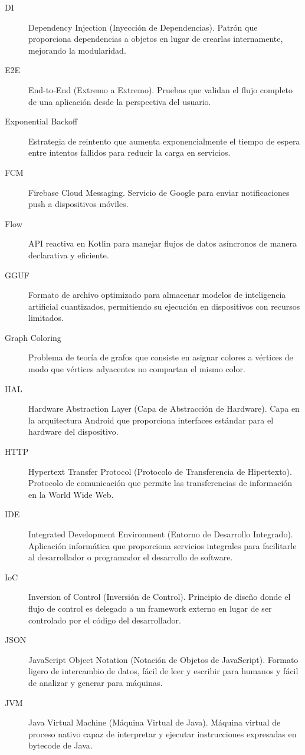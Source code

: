 \begin{description}
    \item[DI] Dependency Injection (Inyección de Dependencias). Patrón que proporciona dependencias a objetos en lugar de crearlas internamente, mejorando la modularidad.
    \item[E2E] End-to-End (Extremo a Extremo). Pruebas que validan el flujo completo de una aplicación desde la perspectiva del usuario.
    \item[Exponential Backoff] Estrategia de reintento que aumenta exponencialmente el tiempo de espera entre intentos fallidos para reducir la carga en servicios.
    \item[FCM] Firebase Cloud Messaging. Servicio de Google para enviar notificaciones push a dispositivos móviles.
    \item[Flow] API reactiva en Kotlin para manejar flujos de datos asíncronos de manera declarativa y eficiente.
    \item[GGUF] Formato de archivo optimizado para almacenar modelos de inteligencia artificial cuantizados, permitiendo su ejecución en dispositivos con recursos limitados.
    \item[Graph Coloring] Problema de teoría de grafos que consiste en asignar colores a vértices de modo que vértices adyacentes no compartan el mismo color.
    \item[HAL] Hardware Abstraction Layer (Capa de Abstracción de Hardware). Capa en la arquitectura Android que proporciona interfaces estándar para el hardware del dispositivo.
    \item[HTTP] Hypertext Transfer Protocol (Protocolo de Transferencia de Hipertexto). Protocolo de comunicación que permite las transferencias de información en la World Wide Web.
    \item[IDE] Integrated Development Environment (Entorno de Desarrollo Integrado). Aplicación informática que proporciona servicios integrales para facilitarle al desarrollador o programador el desarrollo de software.
    \item[IoC] Inversion of Control (Inversión de Control). Principio de diseño donde el flujo de control es delegado a un framework externo en lugar de ser controlado por el código del desarrollador.
    \item[JSON] JavaScript Object Notation (Notación de Objetos de JavaScript). Formato ligero de intercambio de datos, fácil de leer y escribir para humanos y fácil de analizar y generar para máquinas.
    \item[JVM] Java Virtual Machine (Máquina Virtual de Java). Máquina virtual de proceso nativo capaz de interpretar y ejecutar instrucciones expresadas en bytecode de Java.

\end{description}

